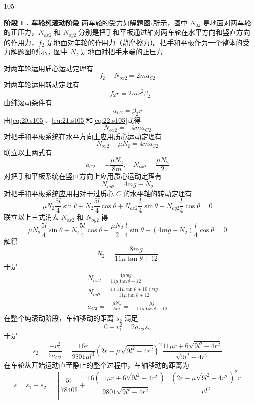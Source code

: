 \begin{solution}{105}
\begin{subsolution}
\textbf{阶段 II. 车轮纯滚动阶段}
两车轮的受力如解题图e所示，图中 $N_{02}$ 是地面对两车轮的正压力，$N_{ox2}$ 和 $N_{oy2}$ 分别是把手和平板通过轴对两车轮在水平方向和竖直方向的作用力，$f_{2}$ 是地面对车轮的作用力（静摩擦力）。把手和平板作为一个整体的受力解题图f所示，图中 $N_{2}$ 是地面对把手末端的正压力.

对两车轮运用质心运动定理有
\begin{equation}
f_{2} - N_{ox2} = 2m a_{C2}
\label{eq:20.s105}
\end{equation}
对两车轮运用转动定理有
\begin{equation}
- f_{2} r = 2m r^{2} \beta_{2}
\label{eq:21.s105}
\end{equation}
由纯滚动条件有
\begin{equation}
a_{C2} = \beta_{2} r
\label{eq:22.s105}
\end{equation}
由\eqref{eq:20.s105}、\eqref{eq:21.s105}和\eqref{eq:22.s105}式得
\[
N_{ox2} = -4m a_{C2}
\]
对把手和平板系统在水平方向上应用质心运动定理有
\[
N_{ox2} - \mu N_{2} = 4m a_{C2}
\]
联立以上两式有
\[
a_{C2} = -\frac{\mu N_{2}}{8m},\quad N_{ox2} = \frac{\mu N_{2}}{2}
\]
对把手和平板系统在竖直方向上应用质心运动定理有
\[
N_{oy2} = 4mg - N_{2}
\]
对把手和平板系统应用相对于过质心 $C$ 的水平轴的转动定理有
\[
\mu N_{2} \frac{5l}{4}\sin\theta + N_{2} \frac{5l}{4}\cos\theta + N_{ox2}\frac{l}{4}\sin\theta - N_{oy2}\frac{l}{4}\cos\theta = 0
\]
联立以上三式消去 $N_{ox2}$ 和 $N_{oy2}$ 得
\[
\mu N_{2} \frac{5l}{4}\sin\theta + N_{2} \frac{5l}{4}\cos\theta + \frac{\mu N_{2}}{2}\frac{l}{4}\sin\theta - (4mg - N_{2})\frac{l}{4}\cos\theta = 0
\]
解得
\[
N_{2} = \frac{8mg}{11\mu\tan\theta + 12}
\]
于是
\begin{equation}
\begin{array}{l}
N_{ox2} = \frac{4\mu m g}{11\mu\tan\theta + 12} \\
N_{oy2} = \frac{4(11\mu\tan\theta + 10) m g}{11\mu\tan\theta + 12} \\
a_{C2} = -\frac{\mu N_{2}}{8m} = -\frac{\mu g}{11\mu\tan\theta + 12}
\end{array}
\label{eq:23.s105}
\end{equation}
在整个纯滚动阶段，车轴移动的距离 $s_{2}$ 满足
\[
0 - v_{1}^{2} = 2 a_{C2} s_{2}
\]
于是
\begin{equation}
s_{2} = \frac{-v_{1}^{2}}{2 a_{C2}} = \frac{16 r}{9801 \mu l^{3}} (2r - \mu\sqrt{9l^{2} - 4r^{2}})^{2} \frac{11\mu r + 6\sqrt{9l^{2} - 4r^{2}}}{\sqrt{9l^{2} - 4r^{2}}}
\label{eq:24.s105}
\end{equation}
在车轮从开始运动直至静止的整个过程中，车轴移动的距离为
\begin{equation}
s = s_{1} + s_{2} = \left[ \frac{57}{78408} + \frac{16(11\mu r + 6\sqrt{9l^{2} - 4r^{2}})}{9801\sqrt{9l^{2} - 4r^{2}}} \right] \frac{(2r - \mu\sqrt{9l^{2} - 4r^{2}})^{2} r}{\mu l^{2}}
\label{eq:25.s105}
\end{equation}
\end{subsolution}
\end{solution}